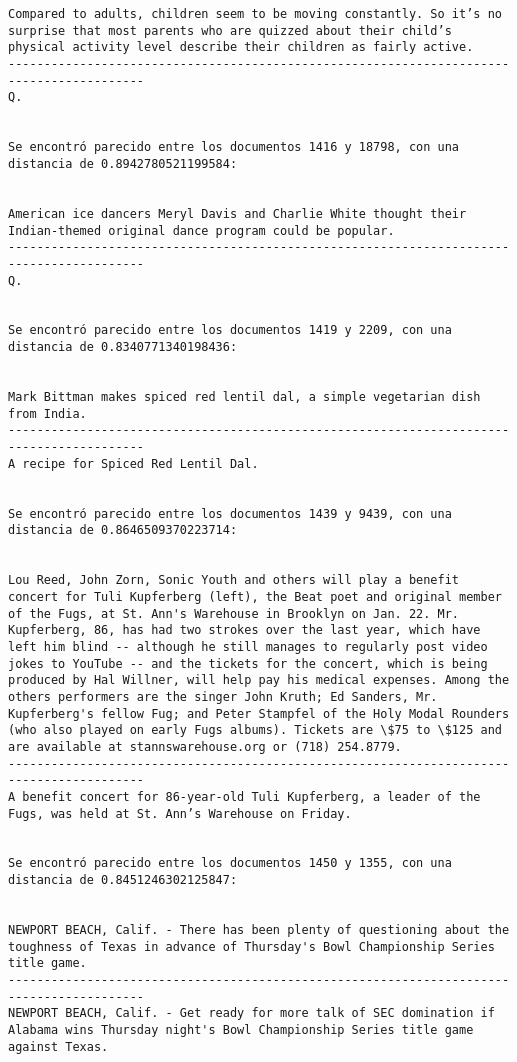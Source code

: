 \documentclass[11pt]{article}
\begin{document}
\begin{Verbatim}[commandchars=\\\{\}]
Compared to adults, children seem to be moving constantly. So it’s no surprise that most parents who are quizzed about their child’s physical activity level describe their children as fairly active.
-----------------------------------------------------------------------------------------
Q.


Se encontró parecido entre los documentos 1416 y 18798, con una distancia de 0.8942780521199584:


American ice dancers Meryl Davis and Charlie White thought their Indian-themed original dance program could be popular.
-----------------------------------------------------------------------------------------
Q.


Se encontró parecido entre los documentos 1419 y 2209, con una distancia de 0.8340771340198436:


Mark Bittman makes spiced red lentil dal, a simple vegetarian dish from India.
-----------------------------------------------------------------------------------------
A recipe for Spiced Red Lentil Dal.


Se encontró parecido entre los documentos 1439 y 9439, con una distancia de 0.8646509370223714:


Lou Reed, John Zorn, Sonic Youth and others will play a benefit concert for Tuli Kupferberg (left), the Beat poet and original member of the Fugs, at St. Ann's Warehouse in Brooklyn on Jan. 22. Mr. Kupferberg, 86, has had two strokes over the last year, which have left him blind -- although he still manages to regularly post video jokes to YouTube -- and the tickets for the concert, which is being produced by Hal Willner, will help pay his medical expenses. Among the others performers are the singer John Kruth; Ed Sanders, Mr. Kupferberg's fellow Fug; and Peter Stampfel of the Holy Modal Rounders (who also played on early Fugs albums). Tickets are \$75 to \$125 and are available at stannswarehouse.org or (718) 254.8779.
-----------------------------------------------------------------------------------------
A benefit concert for 86-year-old Tuli Kupferberg, a leader of the Fugs, was held at St. Ann’s Warehouse on Friday.


Se encontró parecido entre los documentos 1450 y 1355, con una distancia de 0.8451246302125847:


NEWPORT BEACH, Calif. - There has been plenty of questioning about the toughness of Texas in advance of Thursday's Bowl Championship Series title game.
-----------------------------------------------------------------------------------------
NEWPORT BEACH, Calif. - Get ready for more talk of SEC domination if Alabama wins Thursday night's Bowl Championship Series title game against Texas.



\end{Verbatim}
\end{document}
